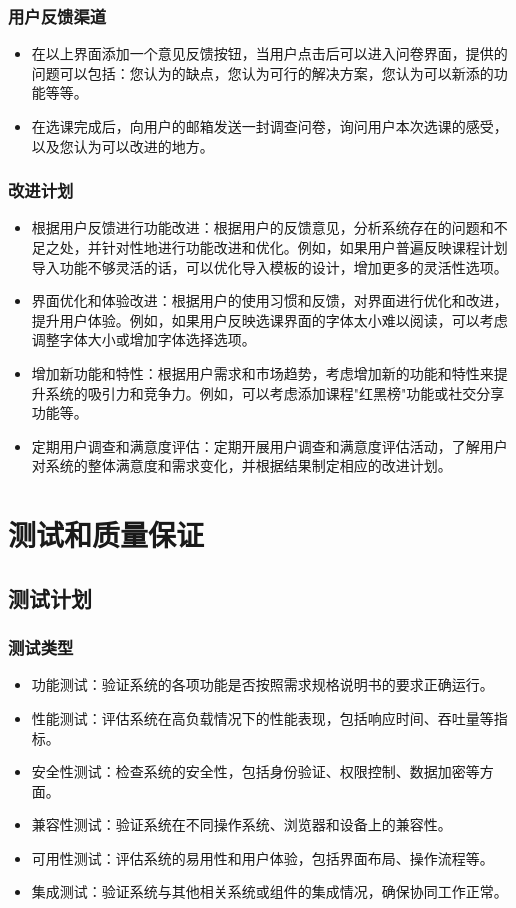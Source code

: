 \documentclass{article}
\begin{document}
\subsubsection{用户反馈渠道}
\begin{itemize}
	\item 在以上界面添加一个意见反馈按钮，当用户点击后可以进入问卷界面，提供的问题可以包括：您认为的缺点，您认为可行的解决方案，您认为可以新添的功能等等。
	\item 在选课完成后，向用户的邮箱发送一封调查问卷，询问用户本次选课的感受，以及您认为可以改进的地方。
\end{itemize}

\subsubsection{改进计划}
\begin{itemize}
	\item 根据用户反馈进行功能改进：根据用户的反馈意见，分析系统存在的问题和不足之处，并针对性地进行功能改进和优化。例如，如果用户普遍反映课程计划导入功能不够灵活的话，可以优化导入模板的设计，增加更多的灵活性选项。
	\item 界面优化和体验改进：根据用户的使用习惯和反馈，对界面进行优化和改进，提升用户体验。例如，如果用户反映选课界面的字体太小难以阅读，可以考虑调整字体大小或增加字体选择选项。
	\item 增加新功能和特性：根据用户需求和市场趋势，考虑增加新的功能和特性来提升系统的吸引力和竞争力。例如，可以考虑添加课程"红黑榜"功能或社交分享功能等。
	\item 定期用户调查和满意度评估：定期开展用户调查和满意度评估活动，了解用户对系统的整体满意度和需求变化，并根据结果制定相应的改进计划。
\end{itemize}

\section{测试和质量保证}
\subsection{测试计划}
\subsubsection{测试类型}
\begin{itemize}
	\item 功能测试：验证系统的各项功能是否按照需求规格说明书的要求正确运行。
	\item 性能测试：评估系统在高负载情况下的性能表现，包括响应时间、吞吐量等指标。
	\item 安全性测试：检查系统的安全性，包括身份验证、权限控制、数据加密等方面。
	\item 兼容性测试：验证系统在不同操作系统、浏览器和设备上的兼容性。
	\item 可用性测试：评估系统的易用性和用户体验，包括界面布局、操作流程等。
	\item 集成测试：验证系统与其他相关系统或组件的集成情况，确保协同工作正常。
\end{itemize}
	
\end{document}
